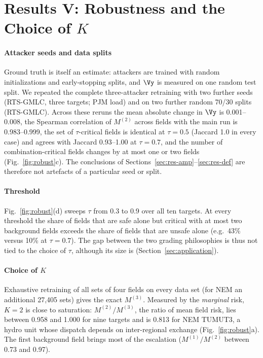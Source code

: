 \section{Results V: Robustness and the Choice of $K$}\label{sec:res-robust}

\paragraph{Attacker seeds and data splits}
Ground truth is itself an estimate: attackers are trained with random initializations and
early-stopping splits, and $\Vy$ is measured on one random test split. We repeated the complete
three-attacker retraining with two further seeds (RTS-GMLC, three targets; PJM load) and on two
further random 70/30 splits (RTS-GMLC). Across these reruns the mean absolute change in $\Vy$ is
0.001--0.008, the Spearman correlation of $M^{(2)}$ across fields with the main run is 0.983--0.999,
the set of $\tau$-critical fields is identical at $\tau=0.5$ (Jaccard 1.0 in every case) and agrees
with Jaccard 0.93--1.00 at $\tau=0.7$, and the number of combination-critical fields changes by at
most one or two fields (Fig.~\ref{fig:robust}c). The conclusions of
Sections~\ref{sec:res-amp}--\ref{sec:res-def} are therefore not artefacts of a particular seed or
split.

\paragraph{Threshold}
Fig.~\ref{fig:robust}(d) sweeps $\tau$ from 0.3 to 0.9 over all ten targets. At every threshold the
share of fields that are safe alone but critical with at most two background fields exceeds the share
of fields that are unsafe alone (e.g.\ 43\% versus 10\% at $\tau=0.7$). The gap between the two grading
philosophies is thus not tied to the choice of $\tau$, although its size is
(Section~\ref{sec:application}).

\paragraph{Choice of $K$}
Exhaustive retraining of all sets of four fields on every data set (for NEM an additional 27,405 sets)
gives the exact $M^{(3)}$. Measured by the \emph{marginal} risk, $K=2$ is close to saturation:
$M^{(2)}/M^{(3)}$, the ratio of mean field risk, lies between 0.958 and 1.000 for nine targets and is
0.813 for NEM TUMUT3, a hydro unit whose dispatch depends on inter-regional exchange
(Fig.~\ref{fig:robust}a). The first background field brings most of the escalation ($M^{(1)}/M^{(2)}$
between 0.73 and 0.97).

